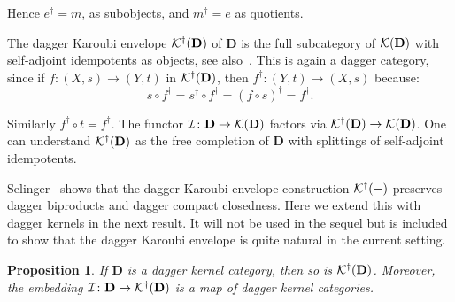 \documentclass{article}
\newtheorem{proposition}[theorem]{Proposition}
\newcommand{\after}{\mathrel{\circ}}
\newcommand{\Cat}[1]{\ensuremath{\mathbf{#1}}}
\newcommand{\Karoubi}[1]{{\cal K}(#1)}
\newcommand{\dagKaroubi}[1]{{\cal K}^{\dag}(#1)}
\begin{document}
\noindent Hence $e^{\dag} = m$, as subobjects, and $m^{\dag} = e$ as
quotients.

The dagger Karoubi envelope $\dagKaroubi{\Cat{D}}$ of $\Cat{D}$ is the
full subcategory of $\Karoubi{\Cat{D}}$ with self-adjoint idempotents
as objects, see also~\cite{Selinger08}. This is again a dagger
category, since if $f\colon (X,s) \rightarrow (Y,t)$ in
$\dagKaroubi{\Cat{D}}$, then $f^{\dag} \colon (Y,t) \rightarrow (X,s)$
because:
$$s \after f^{\dag}
=
s^{\dag} \after f^{\dag}
=
(f \after s)^{\dag}
=
f^{\dag}.$$

\noindent Similarly $f^{\dag} \after t = f^{\dag}$.  The functor
${\cal I}\colon \Cat{D} \rightarrow \Karoubi{\Cat{D}}$ factors via
$\dagKaroubi{\Cat{D}} \rightarrow \Karoubi{\Cat{D}}$. One can
understand $\dagKaroubi{\Cat{D}}$ as the free completion of \Cat{D}
with splittings of self-adjoint idempotents.

Selinger~\cite{Selinger08} shows that the dagger Karoubi envelope
construction $\dagKaroubi{-}$ preserves dagger biproducts and dagger
compact closedness. Here we extend this with dagger kernels in the
next result. It will not be used in the sequel but is included to show
that the dagger Karoubi envelope is quite natural in the current
setting.


\begin{proposition}
\label{KaroubiKernelProp}
If \Cat{D} is a dagger kernel category, then so is
$\dagKaroubi{\Cat{D}}$. Moreover, the embedding ${\cal I}\colon
\Cat{D} \rightarrow \dagKaroubi{\Cat{D}}$ is a map of dagger kernel
categories.
\end{proposition}
\end{document}
